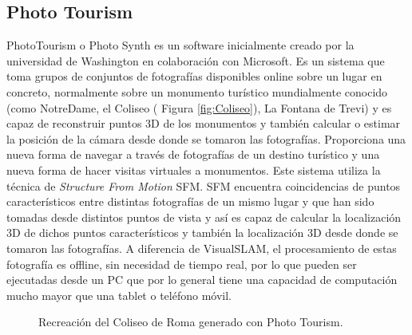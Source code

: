 \subsection{Photo Tourism}
PhotoTourism o Photo Synth es un software inicialmente creado por la universidad de  Washington en colaboración con Microsoft. Es un sistema que toma grupos de conjuntos de fotografías disponibles online sobre un lugar en concreto, normalmente sobre un monumento turístico mundialmente conocido (como NotreDame, el Coliseo ( Figura \ref{fig:Coliseo}), La Fontana de Trevi) y es capaz de reconstruir puntos 3D de los monumentos y también calcular o estimar la posición de la cámara desde donde se tomaron las fotografías. Proporciona una nueva forma de navegar a través de fotografías de un destino turístico y una nueva forma de hacer visitas virtuales a monumentos.
Este sistema utiliza la técnica de \textit {Structure From Motion} SFM. SFM encuentra coincidencias de  puntos característicos entre distintas fotografías de un mismo lugar y que han sido tomadas desde distintos puntos de vista y así es capaz de calcular la localización 3D de dichos puntos característicos y también la localización 3D desde donde se tomaron las fotografías.
A diferencia de VisualSLAM, el procesamiento de estas fotografía es offline, sin necesidad de tiempo real, por lo que pueden ser ejecutadas desde un PC que por lo general tiene una capacidad de computación mucho mayor que una tablet o teléfono móvil.

\begin{figure}[htbp]
\begin{center}
\end{center}
\caption{Recreación del Coliseo de Roma generado con Photo Tourism. }
\end{figure}

